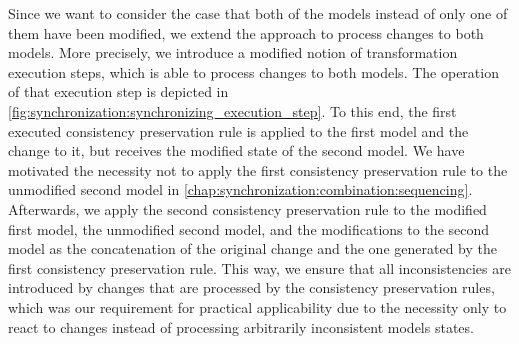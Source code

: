 Since we want to consider the case that both of the models instead of only one of them have been modified, we extend the approach to process changes to both models.
More precisely, we introduce a modified notion of transformation execution steps, which is able to process changes to both models.
The operation of that execution step is depicted in \autoref{fig:synchronization:synchronizing_execution_step}.
To this end, the first executed consistency preservation rule is applied to the first model and the change to it, but receives the modified state of the second model.
We have motivated the necessity not to apply the first consistency preservation rule to the unmodified second model in \autoref{chap:synchronization:combination:sequencing}.
Afterwards, we apply the second consistency preservation rule to the modified first model, the unmodified second model, and the modifications to the second model as the concatenation of the original change and the one generated by the first consistency preservation rule.
This way, we ensure that all inconsistencies are introduced by changes that are processed by the consistency preservation rules, which was our requirement for practical applicability due to the necessity only to react to changes instead of processing arbitrarily inconsistent models states.

